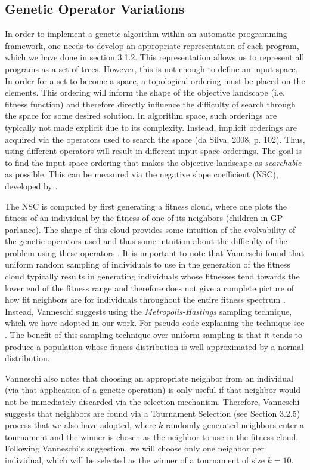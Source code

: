 \documentclass[a4paper,12pt]{report} 	%
\numberwithin{figure}{chapter}
\numberwithin{table}{chapter}
\numberwithin{equation}{chapter}
\begin{document}
\begin{flushleft}
\subsection{Genetic Operator Variations}
In order to implement a genetic algorithm within an automatic programming framework, one needs to develop an appropriate representation of each program, which we have done in section 3.1.2. This representation allows us to represent all programs as a set of trees. However, this is not enough to define an input space. In order for a set to become a space, a topological ordering must be placed on the elements. This ordering will inform the shape of the objective landscape (i.e. fitness function) and therefore directly influence the difficulty of search through the space for some desired solution. In algorithm space, such orderings are typically not made explicit due to its complexity. Instead, implicit orderings are acquired via the operators used to search the space (da Silva, 2008, p. 102). Thus, using different operators will result in different input-space orderings. The goal is to find the input-space ordering that makes the objective landscape as \emph{searchable} as possible. This can be measured via the negative slope coefficient (NSC), developed by \cite[p. 54]{Vanneschi:2004le}.

The NSC is computed by first generating a fitness cloud, where one plots the fitness of an individual by the fitness of one of its neighbors (children in GP parlance). The shape of this cloud provides some intuition of the evolvability of the genetic operators used and thus some intuition about the difficulty of the problem using these operators \cite[p. 130]{Vanneschi:2004le}. It is important to note that Vanneschi found that uniform random sampling of individuals to use in the generation of the fitness cloud typically results in generating individuals whose fitnesses tend towards the lower end of the fitness range and therefore does not give a complete picture of how fit neighbors are for individuals throughout the entire fitness spectrum \cite[p. 132]{Vanneschi:2004le}. Instead, Vanneschi suggests using the \emph{Metropolis-Hastings} sampling technique, which we have adopted in our work. For pseudo-code explaining the technique see \cite[p. 131]{Vanneschi:2004le}. The benefit of this sampling technique over uniform sampling is that it tends to produce a population whose fitness distribution is well approximated by a normal distribution.

Vanneschi also notes that choosing an appropriate neighbor from an individual (via that application of a genetic operation) is only useful if that neighbor would not be immediately discarded via the selection mechanism. Therefore, Vanneschi suggests that neighbors are found via a Tournament Selection (see Section 3.2.5) process that we also have adopted, where $k$ randomly generated neighbors enter a tournament and the winner is chosen as the neighbor to use in the fitness cloud. Following Vanneschi's suggestion, we will choose only one neighbor per individual, which will be selected as the winner of a tournament of size $k=10$.


\end{flushleft}
\end{document}
